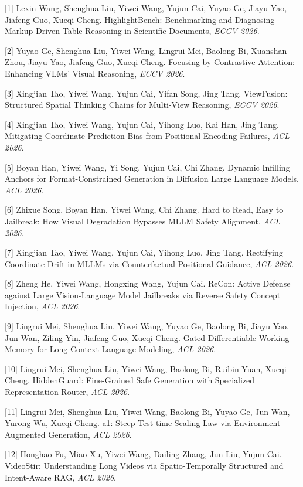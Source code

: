 [1] Lexin Wang, Shenghua Liu, Yiwei Wang, Yujun Cai, Yuyao Ge, Jiayu Yao, Jiafeng Guo, Xueqi Cheng. {HighlightBench}: Benchmarking and Diagnosing Markup-Driven Table Reasoning in Scientific Documents, \textit{ECCV 2026}.

[2] Yuyao Ge, Shenghua Liu, Yiwei Wang, Lingrui Mei, Baolong Bi, Xuanshan Zhou, Jiayu Yao, Jiafeng Guo, Xueqi Cheng. Focusing by Contrastive Attention: Enhancing {VLMs}' Visual Reasoning, \textit{ECCV 2026}.

[3] Xingjian Tao, Yiwei Wang, Yujun Cai, Yifan Song, Jing Tang. {ViewFusion}: Structured Spatial Thinking Chains for Multi-View Reasoning, \textit{ECCV 2026}.

[4] Xingjian Tao, Yiwei Wang, Yujun Cai, Yihong Luo, Kai Han, Jing Tang. Mitigating Coordinate Prediction Bias from Positional Encoding Failures, \textit{ACL 2026}.

[5] Boyan Han, Yiwei Wang, Yi Song, Yujun Cai, Chi Zhang. Dynamic Infilling Anchors for Format-Constrained Generation in Diffusion Large Language Models, \textit{ACL 2026}.

[6] Zhixue Song, Boyan Han, Yiwei Wang, Chi Zhang. Hard to Read, Easy to Jailbreak: How Visual Degradation Bypasses MLLM Safety Alignment, \textit{ACL 2026}.

[7] Xingjian Tao, Yiwei Wang, Yujun Cai, Yihong Luo, Jing Tang. Rectifying Coordinate Drift in MLLMs via Counterfactual Positional Guidance, \textit{ACL 2026}.

[8] Zheng He, Yiwei Wang, Hongxing Wang, Yujun Cai. ReCon: Active Defense against Large Vision-Language Model Jailbreaks via Reverse Safety Concept Injection, \textit{ACL 2026}.

[9] Lingrui Mei, Shenghua Liu, Yiwei Wang, Yuyao Ge, Baolong Bi, Jiayu Yao, Jun Wan, Ziling Yin, Jiafeng Guo, Xueqi Cheng. Gated Differentiable Working Memory for Long-Context Language Modeling, \textit{ACL 2026}.

[10] Lingrui Mei, Shenghua Liu, Yiwei Wang, Baolong Bi, Ruibin Yuan, Xueqi Cheng. HiddenGuard: Fine-Grained Safe Generation with Specialized Representation Router, \textit{ACL 2026}.

[11] Lingrui Mei, Shenghua Liu, Yiwei Wang, Baolong Bi, Yuyao Ge, Jun Wan, Yurong Wu, Xueqi Cheng. a1: Steep Test-time Scaling Law via Environment Augmented Generation, \textit{ACL 2026}.

[12] Honghao Fu, Miao Xu, Yiwei Wang, Dailing Zhang, Jun Liu, Yujun Cai. VideoStir: Understanding Long Videos via Spatio-Temporally Structured and Intent-Aware RAG, \textit{ACL 2026}.

